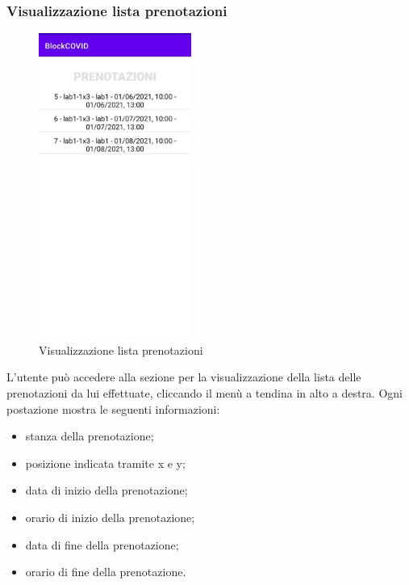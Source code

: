 \subsubsection{Visualizzazione lista prenotazioni}
\begin{figure}[H]
	\centering
	\includegraphics[width=5cm]{res/images/VisualizzaPrenotazioni.png}
	\caption{Visualizzazione lista prenotazioni}
\end{figure}
L’utente può accedere alla sezione per la visualizzazione della lista delle prenotazioni da lui effettuate, cliccando il menù a tendina in alto a destra.
Ogni postazione mostra le seguenti informazioni:
\begin{itemize}
	\item stanza della prenotazione;
	\item posizione indicata tramite x e y;
	\item data di inizio della prenotazione;
	\item orario di inizio della prenotazione;
	\item data di fine della prenotazione;
	\item orario di fine della prenotazione.
\end{itemize}
